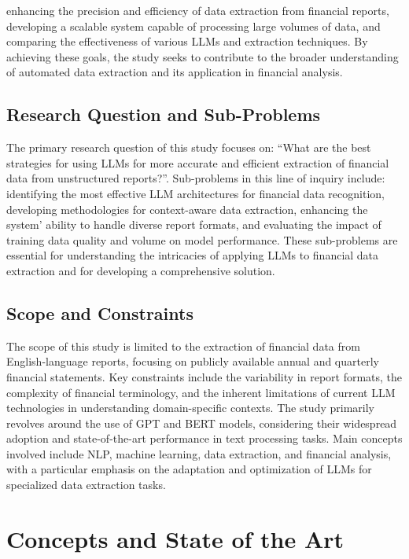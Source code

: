 \documentclass[english, 12pt, a4paper, elec, utf8, a-2b, online]{aaltothesis}
\begin{document}
enhancing the precision and efficiency of data extraction from financial reports, developing a scalable system capable of processing large volumes of data, and comparing the effectiveness of various \ac{LLM}s and extraction techniques. By achieving these goals, the study seeks to contribute to the broader understanding of automated data extraction and its application in financial analysis.

\subsection{Research Question and Sub-Problems}

The primary research question of this study focuses on: ``What are the best strategies for using \ac{LLM}s for more accurate and efficient extraction of financial data from unstructured reports?''.
Sub-problems in this line of inquiry include: identifying the most effective LLM architectures for financial data recognition, developing methodologies for context-aware data extraction, enhancing the system’ ability to handle diverse report formats, and evaluating the impact of training data quality and volume on model performance.
These sub-problems are essential for understanding the intricacies of applying \ac{LLM}s to financial data extraction and for developing a comprehensive solution.

\subsection{Scope and Constraints}

The scope of this study is limited to the extraction of financial data from English-language reports, focusing on publicly available annual and quarterly financial statements. Key constraints include the variability in report formats, the complexity of financial terminology, and the inherent limitations of current LLM technologies in understanding domain-specific contexts. The study primarily revolves around the use of GPT and BERT models, considering their widespread adoption and state-of-the-art performance in text processing tasks. Main concepts involved include \ac{NLP}, machine learning, data extraction, and financial analysis, with a particular emphasis on the adaptation and optimization of LLMs for specialized data extraction tasks.

\clearpage

\section{Concepts and State of the Art}
\end{document}
